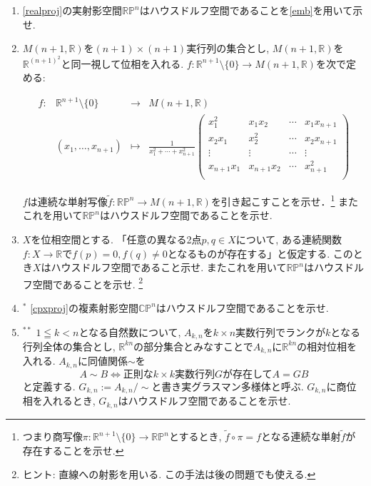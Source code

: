 \documentclass[dvipdfmx,a4paper,11pt]{article}
\newcommand{\R}{\mathbb{R}}
\newcommand{\C}{\mathbb{C}}
\theoremstyle{definition}
\begin{document}
\begin{enumerate}[label=\textbf{問}\ref*{sec-Hausdorff}.\arabic*]
\item \ref{realproj}の実射影空間$\R\mathbb{P}^{n}$はハウスドルフ空間であることを\ref{emb}を用いて示せ. %

\item $M(n+1, \R)$を$(n+1) \times (n+1)$実行列の集合とし, $M(n+1, \R) $を$\R^{(n+1)^2}$と同一視して位相を入れる. 
$f: \R^{n+1} \setminus \{0\} \rightarrow  M(n+1, \R) $を次で定める:

$$
\begin{matrix}
f: & \R^{n+1} \setminus \{0\} &\rightarrow & M(n+1, \R) \\
&(x_1, \ldots, x_{n+1})&\mapsto & 
\frac{1}{x_{1}^{2} + \cdots + x_{n+1}^{2} }
 \begin{pmatrix}
 x_{1}^{2} & x_1x_2& \cdots&x_1x_{n+1} \\ 
x_2x_1& x_{2}^{2}& \cdots&x_2x_{n+1} \\ 
\vdots &\vdots& \cdots& \vdots \\ 
x_{n+1}x_1&  x_{n+1}x_2& \cdots&x_{n+1}^{2} \\ 
\end{pmatrix}
\end{matrix}
$$


 $f$は連続な単射写像$\widetilde{f} : \R\mathbb{P}^{n} \rightarrow M(n+1, \R)$を引き起こすことを示せ．\footnote{つまり商写像$\pi : \R^{n+1} \setminus \{0\}  \to \R\mathbb{P}^{n}$とするとき, $\widetilde{f} \circ \pi = f$となる連続な単射$\widetilde{f}$が存在することを示せ.}
 またこれを用いて$\R\mathbb{P}^{n}$はハウスドルフ空間であることを示せ. 
 
\item $X$を位相空間とする. 「任意の異なる2点$p, q \in X$について, ある連続関数$f : X \rightarrow \R$で$f(p)=0, f(q)\neq 0$となるものが存在する」と仮定する. このとき$X$はハウスドルフ空間であること示せ. またこれを用いて$\R\mathbb{P}^{n}$はハウスドルフ空間であることを示せ. \footnote{ヒント: 直線への射影を用いる. この手法は後の問題でも使える.}
  

\item $^{*}$
	\ref{cpxproj}の複素射影空間$\C\mathbb{P}^{n}$はハウスドルフ空間であることを示せ.

\item \label{grassmann}$^{**}$ $1 \leqq k < n$となる自然数について, 
$A_{k, n}$を$k \times n$実数行列でランクが$k$となる行列全体の集合とし, $\R^{kn}$の部分集合とみなすことで$A_{k,n}$に$\R^{kn}$の相対位相を入れる. 
$A_{k, n}$に同値関係$\sim$を
$$
	A \sim B \Leftrightarrow \text{正則な$k \times k$実数行列$G$が存在して$A = GB$}
$$
と定義する. $G_{k,n}:= A_{k, n}/\sim$と書き実グラスマン多様体と呼ぶ. $G_{k,n}$に商位相を入れるとき, $G_{k,n}$はハウスドルフ空間であることを示せ. 


\end{enumerate}
\end{document}
